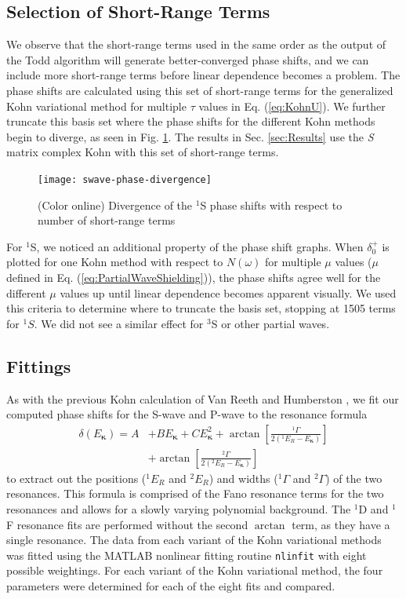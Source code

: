 \documentclass[preprint,showpacs,preprintnumbers,amsmath,amssymb,longbibliography,pra,aps]{revtex4-1}
\begin{document}
\subsection{Selection of Short-Range Terms}
\label{sec:Truncation}
We observe that the short-range terms used in the same order as the output of the Todd algorithm will generate better-converged phase shifts, and we can include more short-range terms before linear dependence becomes a problem. The phase shifts are calculated using this set of short-range terms for the generalized Kohn variational method for multiple $\tau$ values in Eq. (\ref{eq:KohnU}). We further truncate this basis set where the phase shifts for the different Kohn methods begin to diverge, as seen in Fig. \ref{fig:swave-phase-divergence}. The results in Sec. \ref{sec:Results} use the \emph{S} matrix complex Kohn with this set of short-range terms.

\begin{figure}[H]
	\centering
	\texttt{[image: swave-phase-divergence]}
	\caption{(Color online) Divergence of the $^1$S phase shifts with respect to number of short-range terms}
	\label{fig:swave-phase-divergence}
\end{figure}

For $^1$S, we noticed an additional property of the phase shift graphs. When $\delta_0^+$ is plotted for one Kohn method with respect to $N(\omega)$ for multiple $\mu$ values ($\mu$ defined in Eq. (\ref{eq:PartialWaveShielding})), the phase shifts agree well for the different $\mu$ values up until linear dependence becomes apparent visually. We used this criteria to determine where to truncate the basis set, stopping at 1505 terms for $^1S$. We did not see a similar effect for $^3$S or other partial waves.

\subsection{Fittings}
As with the previous Kohn calculation of Van Reeth and Humberston \cite{VanReeth2004}, we fit our computed phase shifts for the S-wave and P-wave to the resonance formula
\begin{align}
\label{eq:ResonanceFit}
\delta(E_{\bm \kappa}) = A &+ B E_{\bm \kappa} + C E_{\bm \kappa}^2 + \arctan \left[ \frac{^1\Gamma}{2(^1E_R - E_{\bm \kappa})} \right]  \nonumber \\
& + \arctan \left[ \frac{^2\Gamma}{2(^2E_R - E_{\bm \kappa})} \right]
\end{align}
to extract out the positions ($^1E_R$ and $^2E_R$) and widths
($^1\Gamma$ and $^2\Gamma$) of the two resonances. 
This formula is comprised of the Fano resonance
terms \cite{Fano1961} for the two resonances and allows for a slowly varying polynomial
background. The $^1$D and $^1$F resonance fits are performed without the second $\arctan$ term, as they have a single resonance. 
The data from each variant of the Kohn variational methods was fitted using the MATLAB \cite{MATLAB} nonlinear fitting routine \texttt{nlinfit} with eight possible weightings.
For each variant of the Kohn variational method, the four parameters were determined for each of the eight fits and compared.
\end{document}

